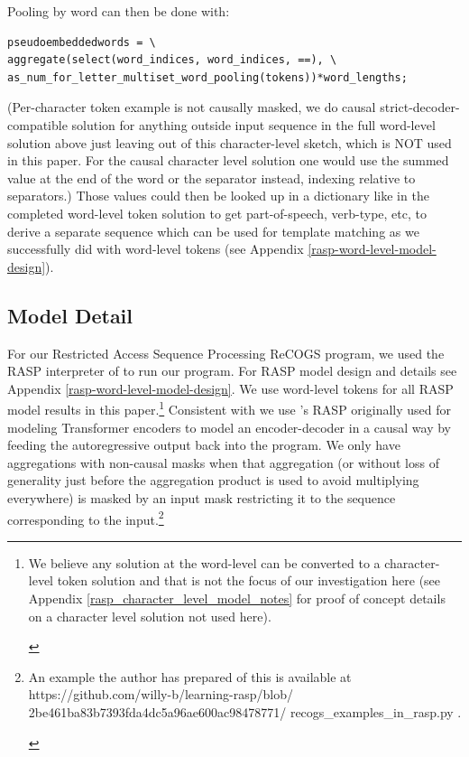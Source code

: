 \documentclass[11pt]{article}
\begin{document}
Pooling by word can then be done with:
\begin{tiny}
\begin{verbatim}
pseudoembeddedwords = \
aggregate(select(word_indices, word_indices, ==), \
as_num_for_letter_multiset_word_pooling(tokens))*word_lengths;
\end{verbatim}
\end{tiny}
(Per-character token example is not causally masked, we do causal strict-decoder-compatible solution for anything outside input sequence in the full word-level solution above just leaving out of this character-level sketch, which is NOT used in this paper. For the causal character level solution one would use the summed value at the end of the word or the separator instead, indexing relative to separators.) 
\clearpage
Those values could then be looked up in a dictionary like in the completed word-level token solution to get part-of-speech, verb-type, etc, to derive a separate sequence which can be used for template matching as we successfully did with word-level tokens (see Appendix \ref{rasp-word-level-model-design}).


\clearpage

\subsection{Model Detail}
\label{model_detail}

For our Restricted Access Sequence Processing ReCOGS program, we used the RASP interpreter of \cite{Weiss2021} to run our program. For RASP model design and details see Appendix \ref{rasp-word-level-model-design}. We use word-level tokens for all RASP model results in this paper.\footnote{\begin{footnotesize}We believe any solution at the word-level can be converted to a character-level token solution and that is not the focus of our investigation here (see Appendix \ref{rasp_character_level_model_notes} for proof of concept details on a character level solution not used here).\end{footnotesize}}
Consistent with \cite{Zhou2024} we use \cite{Weiss2021}'s RASP originally used for modeling Transformer encoders to model an encoder-decoder in a causal way by feeding the autoregressive output back into the program. We only have aggregations with non-causal masks when that aggregation (or without loss of generality just before the aggregation product is used to avoid multiplying everywhere) is masked by an input mask restricting it to the sequence corresponding to the input.\footnote{\begin{footnotesize}An example the author has prepared of this is available at 
https://github.com/willy-b/learning-rasp/blob/
2be461ba83b7393fda4dc5a96ae600ac98478771/
recogs\_examples\_in\_rasp.py
.\end{footnotesize}}
\end{document}
